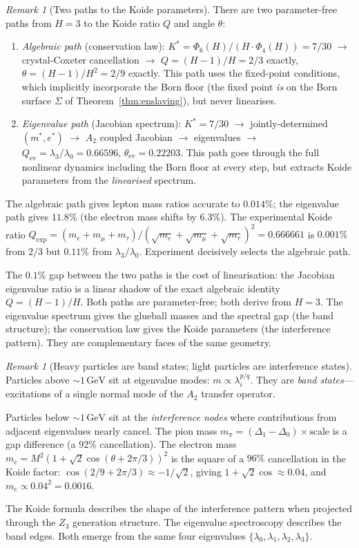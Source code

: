 \documentclass[11pt,a4paper]{article}
\theoremstyle{definition}
\theoremstyle{remark}
\newtheorem{remark}[theorem]{Remark}
\begin{document}
\begin{remark}[Two paths to the Koide parameters]\label{rem:two_paths}
There are two parameter-free paths from $H=3$ to the Koide ratio $Q$ and angle $\theta$:
\begin{enumerate}[nosep]
\item \emph{Algebraic path} (conservation law): $K^*=\Phi_6(H)/(H\cdot\Phi_4(H))=7/30$ $\to$ crystal-Coxeter cancellation $\to$ $Q=(H-1)/H=2/3$ exactly, $\theta=(H-1)/H^2=2/9$ exactly. This path uses the fixed-point conditions, which implicitly incorporate the Born floor (the fixed point \emph{is} on the Born surface $\Sigma$ of Theorem~\ref{thm:enslaving}), but never linearises.
\item \emph{Eigenvalue path} (Jacobian spectrum): $K^*=7/30$ $\to$ jointly-determined $(m^*,e^*)$ $\to$ $A_2$ coupled Jacobian $\to$ eigenvalues $\to$ $Q_{\mathrm{ev}}=\lambda_3/\lambda_0=0.66596$, $\theta_{\mathrm{ev}}=0.22203$. This path goes through the full nonlinear dynamics including the Born floor at every step, but extracts Koide parameters from the \emph{linearised} spectrum.
\end{enumerate}
The algebraic path gives lepton mass ratios accurate to $0.014\%$; the eigenvalue path gives $11.8\%$ (the electron mass shifts by $6.3\%$). The experimental Koide ratio $Q_{\mathrm{exp}}=(m_e+m_\mu+m_\tau)/(\sqrt{m_e}+\sqrt{m_\mu}+\sqrt{m_\tau})^2=0.666661$ is $0.001\%$ from $2/3$ but $0.11\%$ from $\lambda_3/\lambda_0$. Experiment decisively selects the algebraic path.

The $0.1\%$ gap between the two paths is the cost of linearisation: the Jacobian eigenvalue ratio is a linear shadow of the exact algebraic identity $Q=(H-1)/H$. Both paths are parameter-free; both derive from $H=3$. The eigenvalue spectrum gives the glueball masses and the spectral gap (the band structure); the conservation law gives the Koide parameters (the interference pattern). They are complementary faces of the same geometry.
\end{remark}

\begin{remark}[Heavy particles are band states; light particles are interference states]\label{rem:interference}
Particles above $\sim\!1\,\mathrm{GeV}$ sit at eigenvalue modes: $m\propto\lambda_i^{p/q}$. They are \emph{band states}---excitations of a single normal mode of the $A_2$ transfer operator.

Particles below $\sim\!1\,\mathrm{GeV}$ sit at the \emph{interference nodes} where contributions from adjacent eigenvalues nearly cancel. The pion mass $m_\pi=(\Delta_1-\Delta_0)\times\mathrm{scale}$ is a gap difference (a $92\%$ cancellation). The electron mass $m_e=M^2(1+\sqrt{2}\cos(\theta+2\pi/3))^2$ is the square of a $96\%$ cancellation in the Koide factor: $\cos(2/9+2\pi/3)\approx -1/\sqrt{2}$, giving $1+\sqrt{2}\cos\approx 0.04$, and $m_e\propto 0.04^2=0.0016$.

The Koide formula describes the shape of the interference pattern when projected through the $Z_3$ generation structure. The eigenvalue spectroscopy describes the band edges. Both emerge from the same four eigenvalues $\{\lambda_0,\lambda_1,\lambda_2,\lambda_3\}$.
\end{remark}
\end{document}
